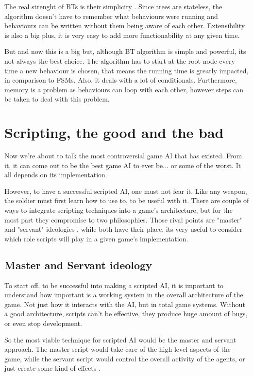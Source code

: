 \documentclass[a4paper, 12pt]{book}
\begin{document}
The real strenght of BTs is their simplicity \cite{BehaviourSelectionAlgorithms}. Since trees are stateless, the algorithm doesn't have to remember what behaviours were running and behaviours can be written without them being aware of each other. Extensibility is also a big plus, it is very easy to add more functionability at any given time.

But and now this is a big but, although BT algorithm is simple and powerful, its not always the best choice. The algorithm has to start at the root node every time a new behaviour is chosen, that means the running time is greatly impacted, in comparison to FSMs. Also, it deals with a lot of conditionals. Furthermore, memory is a problem as behaviours can loop with each other, however steps can be taken to deal with this problem.

\section{Scripting, the good and the bad}

Now we're about to talk the most controversial game AI that has existed. From it, it can come out to be the best game AI to ever be... or some of the worst. It all depends on its implementation.

However, to have a successful scripted AI, one must not fear it. Like any weapon, the soldier must first learn how to use to, to be useful with it. There are couple of ways to integrate scripting techniques into a game's architecture, but for the most part they compromise to two philosophies. Those rival points are "master" and "servant" ideologies \cite{ForbiddenScripting}, while both have their place, its very useful to consider which role scripts will play in a given game's implementation. 

\subsection{Master and Servant ideology}

To start off, to be successful into making a scripted AI, it is important to understand how important is a working system in the overall architecture of the game. Not just how it interacts with the AI, but in total game systems. Without a good architecture, scripts can't be effective, they produce huge amount of bugs, or even stop development.

So the most viable technique for scripted AI would be the master and servant approach. The master script would take care of the high-level aspects of the game, while the servant script would control the overall activity of the agents, or just create some kind of effects \cite{ForbiddenScripting}.  
\end{document}
